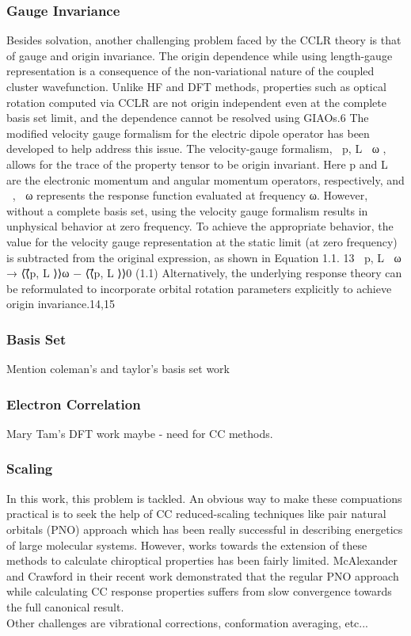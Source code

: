 \subsubsection{Gauge Invariance}
Besides solvation, another challenging problem faced by the CCLR theory is that of 
gauge and origin invariance.
The origin dependence while using length-gauge representation is a consequence of the non-variational nature of the 
coupled cluster wavefunction. Unlike HF and DFT methods, properties such as optical rotation computed via CCLR 
are not origin independent even at the complete basis set limit, and the dependence cannot be resolved using GIAOs.6 
The modified velocity gauge formalism for the electric dipole operator has been developed to help address this 
issue. The velocity-gauge formalism, ⟨⟨⃗p, L⃗ ⟩⟩ω , allows for the trace of the property tensor to be origin 
invariant. Here ⃗p and L⃗ are the electronic momentum and angular momentum operators, respectively, and 
⟨⟨, ⟩⟩ω represents the response function evaluated at frequency ω. However, without a complete basis
set, using the velocity gauge formalism results in unphysical behavior at zero frequency. To achieve the 
appropriate behavior, the value for the velocity gauge representation at the static limit (at zero frequency) 
is subtracted from the original expression, as shown in Equation 1.1. 13
⟨⟨⃗p, L⃗ ⟩⟩ω → ⟨⟨⃗p, L⃗ ⟩⟩ω − ⟨⟨⃗p, L⃗ ⟩⟩0 (1.1) Alternatively, the underlying response theory can be reformulated to incorporate 
orbital rotation parameters explicitly to achieve origin invariance.14,15
\subsubsection{Basis Set}
Mention coleman's and taylor's basis set work 
\subsubsection{Electron Correlation}
Mary Tam's DFT work maybe - need for CC methods.
\subsubsection{Scaling}
In this work, this problem is tackled.
An obvious way to make these compuations practical is to seek the help of CC reduced-scaling 
techniques like pair natural orbitals (PNO) approach\cite{Neese09,NeeseCCSD09} which has been really successful in describing energetics of 
large molecular systems. However, works towards the extension of these methods to calculate chiroptical properties has been 
fairly limited\cite{Gauss00,Korona04,Russ04,McAlexander12,Friedrich15,Russ08}. McAlexander and Crawford in their recent 
work\cite{McAlexander15:LRCC} demonstrated that the regular PNO approach while calculating CC response properties 
suffers from slow convergence towards the full canonical result. \\
Other challenges are vibrational corrections, conformation averaging, etc...\\
